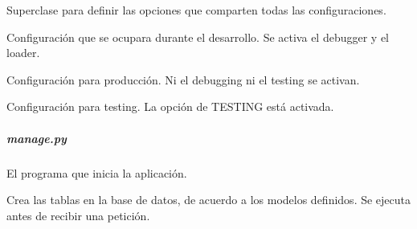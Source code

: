 \begin{fulllineitems}
\label{\detokenize{chapter_two/desc_cloudnao:config.Config}}
Superclase para definir las opciones que comparten
todas las configuraciones.

\end{fulllineitems}


\begin{fulllineitems}
\label{\detokenize{chapter_two/desc_cloudnao:config.DevelopmentConfig}}
Configuración que se ocupara durante el desarrollo.
Se activa el debugger y el loader.

\end{fulllineitems}


\begin{fulllineitems}
\label{\detokenize{chapter_two/desc_cloudnao:config.ProductionConfig}}
Configuración para producción. Ni el debugging ni el testing
se activan.

\end{fulllineitems}


\begin{fulllineitems}
\label{\detokenize{chapter_two/desc_cloudnao:config.TestingConfig}}
Configuración para testing. La opción de TESTING está activada.

\end{fulllineitems}



\subparagraph{manage.py}
\label{\detokenize{chapter_two/desc_cloudnao:module-manage}}\label{\detokenize{chapter_two/desc_cloudnao:manage-py}}
El programa que inicia la aplicación.

\begin{fulllineitems}
\label{\detokenize{chapter_two/desc_cloudnao:manage.create_tables}}
Crea las tablas en la base de datos, de acuerdo a los modelos
definidos. Se ejecuta antes de recibir una petición.

\end{fulllineitems}

